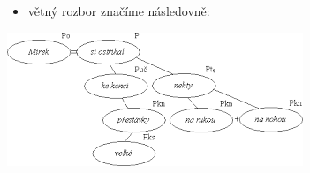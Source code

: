\documentclass{article}
\begin{document}
 \begin{minipage}{0.5\paperwidth}
   \begin{itemize}
     \item větný rozbor značíme následovně:
   \end{itemize}
\end{minipage}
\hfill
\noindent\begin{minipage}{0.5\paperwidth}
    \includegraphics[width=\linewidth]{vetny_rozbor.png}
\end{minipage}
\end{document}
